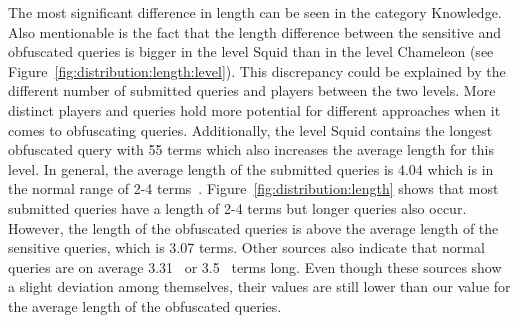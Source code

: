The most significant difference in length can be seen in the category Knowledge. Also mentionable is the fact that the length difference between the sensitive and obfuscated queries is bigger in the level Squid than in the level Chameleon (see Figure~\ref{fig:distribution:length:level}). 
This discrepancy could be explained by the different number of submitted queries and players between the two levels. More distinct players and queries hold more potential for different approaches when it comes to obfuscating queries. Additionally, the level Squid contains the longest obfuscated query with 55 terms which also increases the average length for this level.
In general, the average length of the submitted queries is 4.04 which is in the normal range of 2-4 terms~\cite{arampatzisLength}. Figure~\ref{fig:distribution:length} shows that most submitted queries have a length of 2-4 terms but longer queries also occur. However, the length of the obfuscated queries is above the average length of the sensitive queries, which is 3.07 terms. Other sources also indicate that normal queries are on average 3.31~\cite{fu-finder} or 3.5~\cite{pictureSearch} terms long. Even though these sources show a slight deviation among themselves, their values are still lower than our value for the average length of the obfuscated queries.\par


